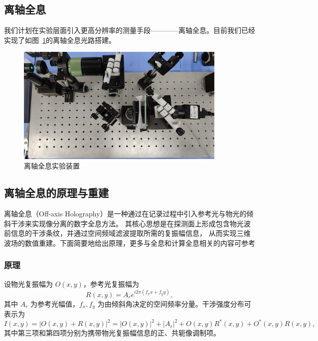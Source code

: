 \documentclass[a4paper]{report} %
\begin{document}
\subsection{离轴全息}
我们计划在实验层面引入更高分辨率的测量手段————离轴全息。目前我们已经实现了如图~\ref{fig:lizhouholo}的离轴全息光路搭建。\par
\begin{figure}[H]
    \centering
    \includegraphics[width=0.9\textwidth]{expreiment.jpg}
    \caption{离轴全息实验装置}
    \label{fig:lizhouholo}
\end{figure}
\subsection{离轴全息的原理与重建}
离轴全息（Off-axis Holography）是一种通过在记录过程中引入参考光与物光的倾斜干涉来实现像分离的数字全息方法。
其核心思想是在探测面上形成包含物光波前信息的干涉条纹，并通过空间频域滤波提取所需的复振幅信息，
从而实现三维波场的数值重建。下面简要地给出原理，更多与全息和计算全息相关的内容可参考\cite{goodman,shuzi1,shuzi2}
\subsubsection{原理}
设物光复振幅为 $O(x,y)$，参考光复振幅为
\begin{equation}
R(x,y) = A_r e^{i 2\pi (f_x x + f_y y)},
\end{equation}
其中 $A_r$ 为参考光幅值，$f_x, f_y$ 为由倾斜角决定的空间频率分量。干涉强度分布可表示为
\begin{equation}
I(x,y) = |O(x,y) + R(x,y)|^2 = |O(x,y)|^2 + |A_r|^2 + O(x,y) R^*(x,y) + O^*(x,y) R(x,y),
\end{equation}
其中第三项和第四项分别为携带物光复振幅信息的正、共轭像调制项。
\end{document}
